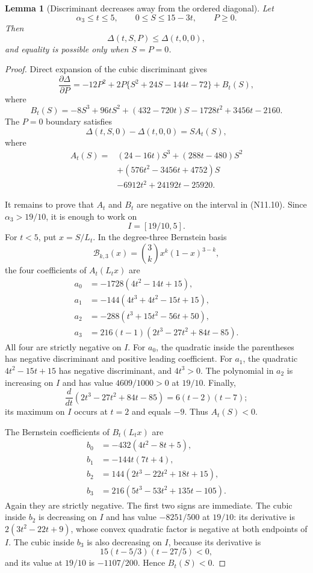 \documentclass[11pt]{article}
\newtheorem{lemma}[theorem]{Lemma}
\theoremstyle{definition}
\theoremstyle{remark}
\begin{document}
\begin{lemma}[Discriminant decreases away from the ordered diagonal]
\label{lem:f2v11-discriminant}
Let
\[
 \alpha_3\le t\le5,\qquad
 0\le S\le15-3t,\qquad P\ge0.
 \tag{N11.10}
\]
Then
\[
 \boxed{\Delta(t,S,P)\le\Delta(t,0,0),}
 \tag{N11.11}
\]
and equality is possible only when \(S=P=0\).
\end{lemma}

\begin{proof}
Direct expansion of the cubic discriminant gives
\[
 \frac{\partial\Delta}{\partial P}
 =-12P^2+2P\{S^2+24S-144t-72\}+B_t(S),
 \tag{N11.12}
\]
where
\[
 B_t(S)
 =-8S^3+96tS^2+(432-720t)S
  -1728t^2+3456t-2160.
 \tag{N11.13}
\]
The \(P=0\) boundary satisfies
\[
 \Delta(t,S,0)-\Delta(t,0,0)=S A_t(S),
 \tag{N11.14}
\]
where
\[
\begin{aligned}
 A_t(S)={}&(24-16t)S^3+(288t-480)S^2\\
 &+(576t^2-3456t+4752)S\\
 &-6912t^2+24192t-25920.
\end{aligned}
\tag{N11.15}
\]

It remains to prove that \(A_t\) and \(B_t\) are negative on the interval
in \textup{(N11.10)}.  Since
\(\alpha_3>19/10\), it is enough to work on
\[
 I=[19/10,5].
 \tag{N11.16}
\]
For \(t<5\), put \(x=S/L_t\).  In the degree-three Bernstein basis
\[
 \mathcal B_{k,3}(x)
 =\binom3k x^k(1-x)^{3-k},
 \tag{N11.17}
\]
the four coefficients of \(A_t(L_tx)\) are
\[
\begin{aligned}
 a_0&=-1728(4t^2-14t+15),\\
 a_1&=-144(4t^3+4t^2-15t+15),\\
 a_2&=-288(t^3+15t^2-56t+50),\\
 a_3&=216(t-1)(2t^3-27t^2+84t-85).
\end{aligned}
\tag{N11.18}
\]
All four are strictly negative on \(I\).  For \(a_0\), the quadratic
inside the parentheses has negative discriminant and positive leading
coefficient.  For \(a_1\), the quadratic
\(4t^2-15t+15\) has negative discriminant, and \(4t^3>0\).
The polynomial in \(a_2\) is increasing on \(I\) and has value
\(4609/1000>0\) at \(19/10\).  Finally,
\[
 \frac d{dt}(2t^3-27t^2+84t-85)=6(t-2)(t-7);
\]
its maximum on \(I\) occurs at \(t=2\) and equals \(-9\).
Thus \(A_t(S)<0\).

The Bernstein coefficients of \(B_t(L_tx)\) are
\[
\begin{aligned}
 b_0&=-432(4t^2-8t+5),\\
 b_1&=-144t(7t+4),\\
 b_2&=144(2t^3-22t^2+18t+15),\\
 b_3&=216(5t^3-53t^2+135t-105).
\end{aligned}
\tag{N11.19}
\]
Again they are strictly negative.  The first two signs are immediate.
The cubic inside \(b_2\) is decreasing on \(I\) and has value
\(-8251/500\) at \(19/10\): its derivative is
\(2(3t^2-22t+9)\), whose convex quadratic factor is negative at both
endpoints of \(I\).  The cubic inside \(b_3\) is also decreasing on
\(I\), because its derivative is
\[
 15(t-5/3)(t-27/5)<0,
\]
and its value at \(19/10\) is \(-1107/200\).
Hence \(B_t(S)<0\).


\end{proof}
\end{document}

